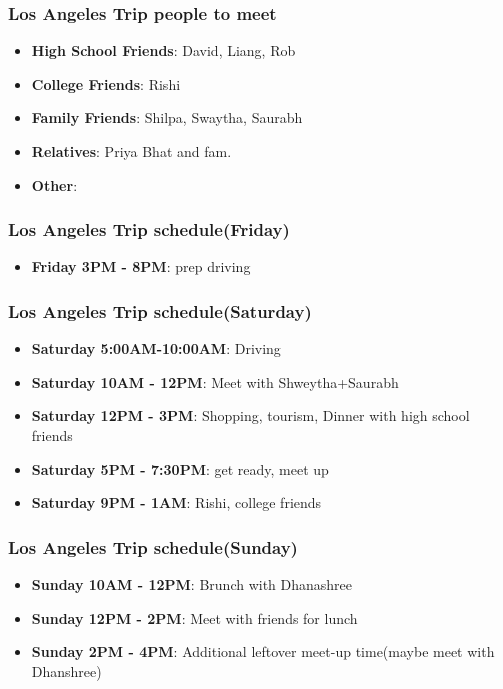 \begin{frame} 
\frametitle{Los Angeles Trip people to meet}
\begin{itemize} 
\item \textbf{High School Friends}: David, Liang, Rob 
\item \textbf{College Friends}: Rishi 
\item \textbf{Family Friends}: Shilpa, Swaytha, Saurabh
\item \textbf{Relatives}: Priya Bhat and fam. 
\item \textbf{Other}: 
\end{itemize} 
\end{frame}

\begin{frame} 
\frametitle{Los Angeles Trip schedule(Friday)}
\begin{itemize} 
\item \textbf{Friday 3PM - 8PM}: prep driving 
\end{itemize} 
\end{frame}

\begin{frame} 
\frametitle{Los Angeles Trip schedule(Saturday)}
\begin{itemize} 
\item \textbf{Saturday 5:00AM-10:00AM}: Driving
\item \textbf{Saturday 10AM - 12PM}: Meet with Shweytha+Saurabh  
\item \textbf{Saturday 12PM - 3PM}: Shopping, tourism, Dinner with high school friends  
\item \textbf{Saturday 5PM - 7:30PM}: get ready, meet up
\item \textbf{Saturday 9PM - 1AM}: Rishi, college friends 
\end{itemize} 
\end{frame}

\begin{frame} 
\frametitle{Los Angeles Trip schedule(Sunday)}
\begin{itemize} 
\item \textbf{Sunday 10AM - 12PM}: Brunch with Dhanashree 
\item \textbf{Sunday 12PM - 2PM}: Meet with friends for lunch
\item \textbf{Sunday 2PM - 4PM}: Additional leftover meet-up time(maybe meet with Dhanshree)
\end{itemize} 
\end{frame}
